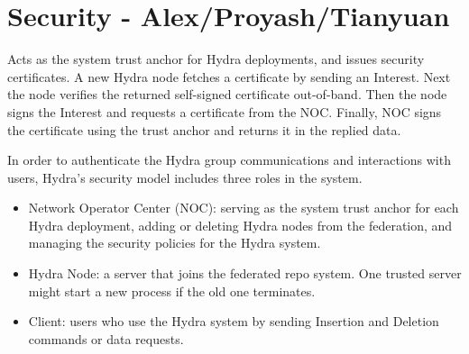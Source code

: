 \section{Security - Alex/Proyash/Tianyuan} \label{sec:security}

Acts as the system trust anchor for Hydra deployments, and issues security certificates. A new Hydra node fetches a certificate by sending an Interest. Next the node verifies the returned self-signed certificate out-of-band. Then the node signs the Interest and requests a certificate from the NOC. Finally, NOC signs the certificate using the trust anchor and returns it in the replied data.




In order to authenticate the Hydra group communications and interactions with users, Hydra’s security model includes three roles in the system.
\begin{itemize}
\item Network Operator Center (NOC): serving as the system trust anchor for each Hydra deployment, adding or deleting Hydra nodes from the federation, and managing the security policies for the Hydra system.
\item Hydra Node: a server that joins the federated repo system. One trusted server might start a new process if the old one terminates.
\item Client: users who use the Hydra system by sending Insertion and Deletion commands or data requests.
\end{itemize}


